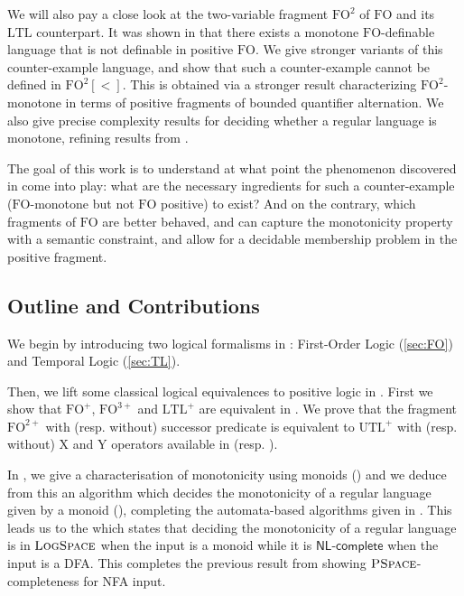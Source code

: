 \documentclass[a4paper,UKenglish,cleveref, autoref, thm-restate]{lipics-v2021}
\newcommand{\FO}{\mathrm{FO}}
\newcommand{\FOp}{\FO^+}
\newcommand{\FOthp}{\FO^{3+}}
\newcommand{\FOtw}{\FO^2}
\newcommand{\FOtwp}{\FO^{2+}}
\newcommand{\LTL}{\mathrm{LTL}}
\newcommand{\LTLp}{\LTL^+}
\newcommand{\UTL}{\mathrm{UTL}}
\newcommand{\UTLp}{\UTL^+}
\newcommand{\X}{\mathrm{X}}
\newcommand{\Y}{\mathrm{Y}}
\renewcommand{\L}{\textsc{LogSpace}}
\newcommand{\NL}{\mathsf{NL}}
\newcommand{\comp}{\mathsf{complete}}
\newcommand{\PSPACE}{\textsc{PSpace}}
\begin{document}
We will also pay a close look at the two-variable fragment $\FOtw$ of $\FO$ and its $\LTL$ counterpart.
It was shown in \cite{PFO} that there exists a monotone $\FO$-definable language that is not definable in positive $\FO$. We give stronger variants of this counter-example language, and show that such a counter-example cannot be defined in $\FOtw[<]$.
This is obtained via a stronger result characterizing $\FOtw$-monotone in terms of positive fragments of bounded quantifier alternation.
We also give precise complexity results for deciding whether a regular language is monotone, refining results from \cite{PFO}.

The goal of this work is to understand at what point the phenomenon discovered in \cite{PFO} come into play: what are the necessary ingredients for such a counter-example ($\FO$-monotone but not $\FO$ positive) to exist? And on the contrary, which fragments of $\FO$ are better behaved, and can capture the monotonicity property with a semantic constraint, and allow for a decidable membership problem in the positive fragment. 



\subsection*{Outline and Contributions}


We begin by introducing two logical formalisms in : First-Order Logic (\ref{sec:FO}) and Temporal Logic (\ref{sec:TL}).

Then, we lift some classical logical equivalences to positive logic in .
First we show that $\FOp$, $\FOthp$ and $\LTLp$ are equivalent in .
We prove that the fragment $\FOtwp$ with (resp. without) successor predicate is equivalent to $\UTLp$ with (resp. without) $\X$ and $\Y$ operators available in  (resp. ).

In , we give a characterisation of monotonicity using monoids () and we deduce from this an algorithm which decides the monotonicity of a regular language given by a monoid (), completing the automata-based algorithms given in \cite{PFO}.
This leads us to the  which states that deciding the monotonicity of a regular language is in $\L$ when the input is a monoid while it is $\NL$-$\comp$ when the input is a DFA. This completes the previous result from \cite{PFO} showing $\PSPACE$-completeness for NFA input.
\end{document}
